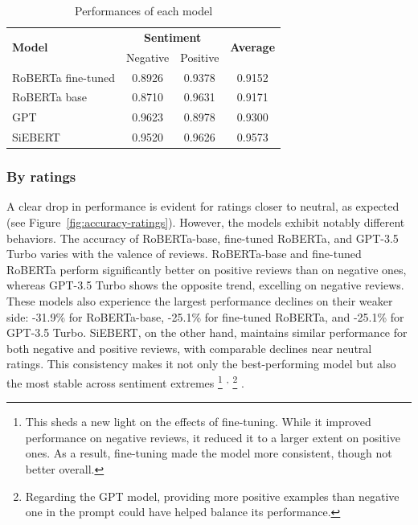 \documentclass{article}
\begin{document}
\begin{table}
  \caption{Performances of each model}
  \label{tab:perfs_by_sentiment}
  \centering
  \begin{tabular}{lccc}
    \toprule
    \multirow{2}{*}{\centering \textbf{Model}} & \multicolumn{2}{c}{\textbf{Sentiment}} & \multirow{2}{*}{\centering \textbf{Average}} \\
    \cmidrule{2-3}
    & Negative & Positive \\
    \midrule
    RoBERTa fine-tuned & 0.8926 & 0.9378 & 0.9152 \\
    RoBERTa base & 0.8710 & 0.9631 & 0.9171 \\
    GPT & 0.9623 & 0.8978 & 0.9300 \\
    SiEBERT & 0.9520 & 0.9626 & 0.9573 \\
    \bottomrule
  \end{tabular}
\end{table}

\subsubsection{By ratings}

A clear drop in performance is evident for ratings closer to neutral, as expected (see Figure~\ref{fig:accuracy-ratings}). However, the models exhibit notably different behaviors. The accuracy of RoBERTa-base, fine-tuned RoBERTa, and GPT-3.5 Turbo varies with the valence of reviews. RoBERTa-base and fine-tuned RoBERTa perform significantly better on positive reviews than on negative ones, whereas GPT-3.5 Turbo shows the opposite trend, excelling on negative reviews. These models also experience the largest performance declines on their weaker side: -31.9\% for RoBERTa-base, -25.1\% for fine-tuned RoBERTa, and -25.1\% for GPT-3.5 Turbo. SiEBERT, on the other hand, maintains similar performance for both negative and positive reviews, with comparable declines near neutral ratings. This consistency makes it not only the best-performing model but also the most stable across sentiment extremes 
\footnote{This sheds a new light on the effects of fine-tuning. While it improved performance on negative reviews, it reduced it to a larger extent on positive ones. As a result, fine-tuning made the model more consistent, though not better overall.}
\textsuperscript{,}
\footnote{Regarding the GPT model, providing more positive examples than negative one in the prompt could have helped balance its performance.}
.
\end{document}
